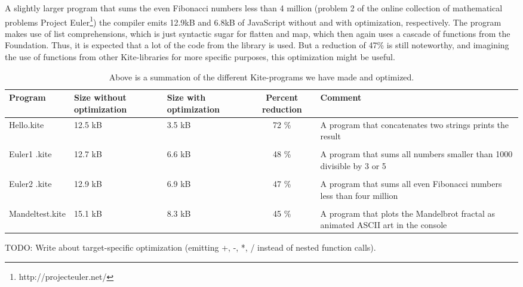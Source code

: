 A slightly larger program that sums the even Fibonacci numbers less than 4 million (problem 2 of the online collection of mathematical problems Project Euler\footnote{http://projecteuler.net/}) the compiler emits 12.9kB and 6.8kB of JavaScript without and with optimization, respectively. The program makes use of list comprehensions, which is just syntactic sugar for flatten and map, which then again uses a cascade of functions from the Foundation. Thus, it is expected that a lot of the code from the library is used. But a reduction of 47\% is still noteworthy, and imagining the use of functions from other Kite-libraries for more specific purposes, this optimization might be useful.


\begin{table}[h]
  \centering
  \begin{tabulary}{0.9\textwidth}{|L| L |L| C | L | }
    \hline
    Program & Size without optimization & Size with optimization & Percent reduction & Comment \\
    \hline
    Hello.kite       & 12.5 kB & 3.5 kB & 72 \% & A program that concatenates two strings prints the result \\
    & & & & \\
    Euler1 .kite       & 12.7 kB & 6.6 kB & 48 \% & A program that sums all numbers smaller than 1000 divisible by 3 or 5 \\
    & & & & \\
    Euler2 .kite       & 12.9 kB & 6.9 kB & 47 \% & A program that sums all even Fibonacci numbers less than four million \\
    & & & & \\
    Mandeltest.kite       & 15.1 kB & 8.3 kB & 45 \% & A program that plots the Mandelbrot fractal as animated ASCII art in the console\\
    \hline
  \end{tabulary}
  \caption{Above is a summation of the different Kite-programs we have made and optimized.}
\end{table}

TODO: Write about target-specific optimization (emitting +, -, *, / instead of nested function calls).
